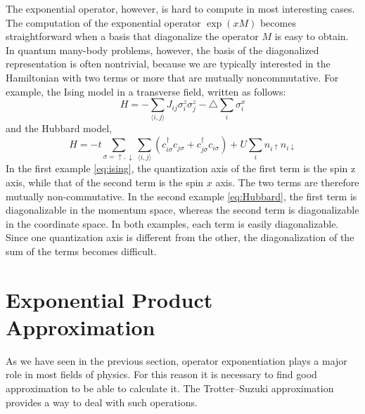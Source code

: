 The exponential operator, however, is hard to compute in most interesting cases. The computation of the exponential operator $\exp{(xM)}$ becomes straightforward when a basis that diagonalize the operator $M$ is easy to obtain. In quantum many-body problems, however, the basis of the diagonalized representation is often nontrivial, because we are typically interested in the Hamiltonian with two terms or more that are mutually noncommutative. For example, the Ising model in a transverse field, written as follows:
\begin{equation} \label{eq:ising}
H = -\sum_{\langle i,j \rangle} J_{ij} \sigma_i^z \sigma_j^z - \triangle\sum_i \sigma_i^x
\end{equation}
and the Hubbard model,
\begin{equation} \label{eq:Hubbard}
H = -t \sum_{\sigma = \uparrow ,\downarrow} \sum_{\langle i,j \rangle} (c_{i\sigma}^\dagger c_{j\sigma} + c_{j\sigma}^\dagger c_{i\sigma}) + U\sum_i n_{i\uparrow} n_{i\downarrow}
\end{equation}
In the first example \eqref{eq:ising}, the quantization axis of the first term is the spin z axis, while that of the second term is the spin $x$ axis. The two terms are therefore mutually non-commutative. In the second example \eqref{eq:Hubbard}, the first term is diagonalizable in the momentum space, whereas the second term is diagonalizable in the coordinate space. In both examples, each term is easily diagonalizable. Since one quantization axis is different from the other, the diagonalization of the sum of the terms becomes difficult.

\section{Exponential Product Approximation}
As we have seen in the previous section, operator exponentiation plays a major role in most fields of physics. For this reason it is necessary to find good approximation to be able to calculate it. The Trotter--Suzuki approximation provides a way to deal with such operations. 

